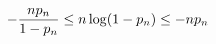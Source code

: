 \documentclass[preview]{standalone}
\begin{document}
\begin{align*}
\special{dvisvgm:raw <g id='unique000'>}-\frac{np_n}{1-p_n}\le n\log(1-p_n)\le-np_n\special{dvisvgm:raw </g>}
\end{align*}
\end{document}
